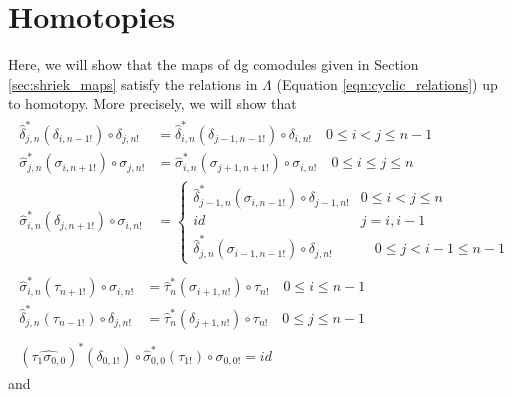 \section{Homotopies}\label{sec:homotopies}
Here, we will show that the maps 
of dg comodules given in Section 
\ref{sec:shriek_maps} satisfy the 
relations in $\Lambda$ (Equation 
\ref{eqn:cyclic_relations}) up to 
homotopy. More precisely, we will 
show that
\begin{subequations}\label{eq:strict}
\begin{align}
\begin{split}\label{eq:strict_1}
\hat{\delta}_{j,n}^*(\delta_{i,n-1!}) \circ \delta_{j,n!} 
&= 
\hat{\delta}_{i,n}^*(\delta_{j-1,n-1!}) \circ \delta_{i,n!} 
  \quad 0 \leq i < j \leq n-1 \\
\hat{\sigma}_{j,n}^*(\sigma_{i,n+1!}) \circ \sigma_{j,n!} 
&= 
\hat{\sigma}_{i,n}^*(\sigma_{j+1,n+1!}) \circ \sigma_{i,n!}
  \quad 0 \leq i \leq j \leq n \\
\hat{\sigma}_{i,n}^*(\delta_{j,n+1!}) \circ \sigma_{i,n!} 
&= 
  \begin{cases}
    \hat{\delta}_{j-1,n}^*(\sigma_{i,n-1!}) \circ \delta_{j-1,n!} 
      & 0 \leq i < j \leq n\\
    id & j = i, i-1\\
    \hat{\delta}_{j,n}^*(\sigma_{i-1,n-1!}) \circ \delta_{j,n!} 
      & \quad 0 \leq j < i-1 \leq n-1
   \end{cases}
\end{split}\\
\begin{split}\label{eq:strict_2}
\hat{\sigma}_{i,n}^*(\tau_{n+1!}) \circ \sigma_{i,n!} 
&= 
\hat{\tau}_n^*(\sigma_{i+1,n!}) \circ \tau_{n!}
  \quad 0 \leq i \leq n-1\\
\hat{\delta}_{j,n}^*(\tau_{n-1!}) \circ \delta_{j,n!} 
&= 
\hat{\tau}_n^*(\delta_{j+1,n!}) \circ \tau_{n!}
  \quad 0 \leq j \leq n-1
\end{split}\\
\begin{split}\label{eq:strict_3}
(\widehat{\tau_{1}\sigma_{0,0}})^*
  (\delta_{0,1!}) \circ
  \hat{\sigma}_{0,0}^*(\tau_{1!}) \circ 
  \sigma_{0,0!}
= id
\end{split} 
\end{align}
\end{subequations}
and 
